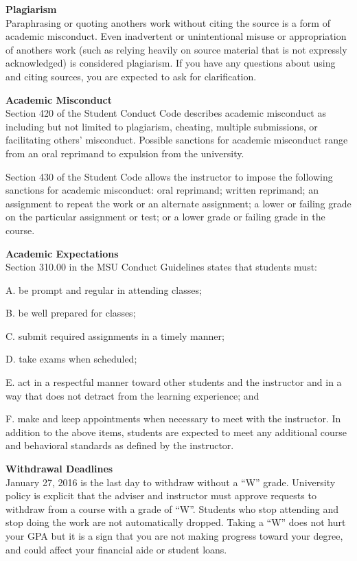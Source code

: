  {\bf Plagiarism  }\\
Paraphrasing or quoting anothers work without citing the source is a
form of academic misconduct. Even inadvertent or unintentional misuse
or appropriation of anothers work (such as relying heavily on source
material that is not expressly acknowledged) is considered
plagiarism. If you have any questions about using and citing sources,
you are expected to ask for clarification. 

 {\bf Academic Misconduct  }\\
Section 420 of the Student Conduct Code describes academic misconduct
as including but not limited to plagiarism, cheating, multiple
submissions, or facilitating others’ misconduct. Possible sanctions
for academic misconduct range from an oral reprimand to expulsion from
the university. 

Section 430 of the Student Code allows the instructor to impose the
following sanctions for academic misconduct: oral reprimand; written
reprimand; an assignment to repeat the work or an alternate
assignment; a lower or failing grade on the particular assignment or
test; or a lower grade or failing grade in the course.  

 {\bf Academic Expectations  }\\
Section 310.00 in the MSU Conduct Guidelines states that students
must:\vspace{-.15in}
\begin{list}{}{}
\item[A.] be prompt and regular in attending classes;
\item[B.] be well prepared for classes; 
\item[C.] submit required assignments in a timely manner;
\item[D.] take exams when scheduled;
\item[E.] act in a respectful manner toward other students and the
  instructor and in a way that does not detract from the learning
  experience; and 
\item[F.] make and keep appointments when necessary to meet with the
  instructor.  
In addition to the above items, students are expected to meet any
additional course and behavioral standards as defined by the
instructor. 
\end{list}

  {\bf Withdrawal Deadlines  }\\
 January 27, 2016 is the last day to withdraw without a ``W'' grade.
 University policy is explicit that the adviser and instructor must
 approve requests to withdraw from a course with a grade of ``W''. 
 Students who stop attending and stop doing the work are not
 automatically dropped.  Taking a ``W'' does not hurt your GPA but it
 is a sign that you are not making progress toward your degree, and
 could affect your financial aide or student loans. 

